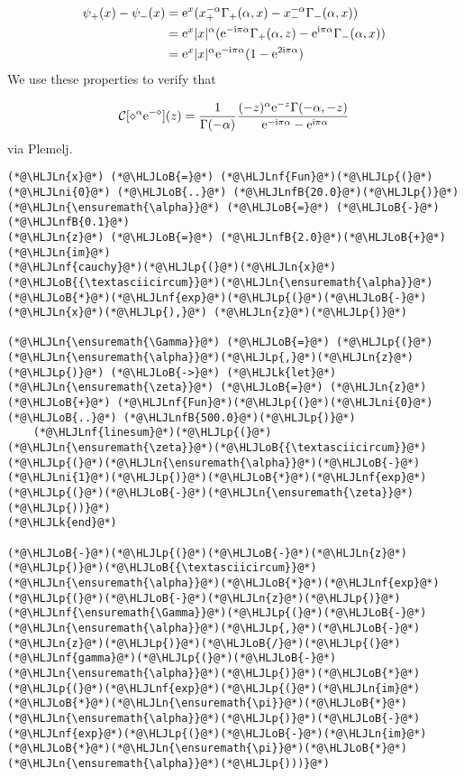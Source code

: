 \documentclass[12pt,landscape]{article}
\newcommand{\HLJLk}[1]{\textcolor[RGB]{148,91,176}{\textbf{#1}}}
\newcommand{\HLJLn}[1]{#1}
\newcommand{\HLJLnf}[1]{\textcolor[RGB]{66,102,213}{#1}}
\newcommand{\HLJLnfB}[1]{\textcolor[RGB]{59,151,46}{#1}}
\newcommand{\HLJLni}[1]{\textcolor[RGB]{59,151,46}{#1}}
\newcommand{\HLJLoB}[1]{\textcolor[RGB]{102,102,102}{\textbf{#1}}}
\newcommand{\HLJLp}[1]{#1}
\def\I{ {\rm i} }
\def\E{ {\rm e} }
\def\CC{ {\cal C} }
\def\addtab#1={#1\;&=}
\def\ccr{\\\addtab}
\def\addtab#1={#1\;&=}
\def\ccr{\\\addtab}
\begin{document}
{\begin{align*}
\psi_+(x) - \psi_-(x) &= \E^x(x_+^{-\alpha} \Gamma_+(\alpha, x) -  x_-^{-\alpha}\Gamma_-(\alpha, x)) \ccr
= \E^x |x|^\alpha (\E^{-\I \pi \alpha} \Gamma_+(\alpha, z) - \E^{\I \pi \alpha} \Gamma_-(\alpha,x)) \ccr
 = \E^x |x|^\alpha \E^{-\I \pi \alpha} (1-\E^{2 \I \pi \alpha})
\end{align*}
We use these properties to verify that

\[
\CC[\diamond^\alpha \E^{-\diamond}](z) = {1 \over \Gamma(-\alpha)} {(-z)^\alpha \E^{-z} \Gamma(-\alpha, - z) \over
  \E^{-\I\pi\alpha} - \E^{\I\pi\alpha}}
\]
via Plemelj.


\begin{lstlisting}
(*@\HLJLn{x}@*) (*@\HLJLoB{=}@*) (*@\HLJLnf{Fun}@*)(*@\HLJLp{(}@*)(*@\HLJLni{0}@*) (*@\HLJLoB{..}@*) (*@\HLJLnfB{20.0}@*)(*@\HLJLp{)}@*)
(*@\HLJLn{\ensuremath{\alpha}}@*) (*@\HLJLoB{=}@*) (*@\HLJLoB{-}@*)(*@\HLJLnfB{0.1}@*)
(*@\HLJLn{z}@*) (*@\HLJLoB{=}@*) (*@\HLJLnfB{2.0}@*)(*@\HLJLoB{+}@*)(*@\HLJLn{im}@*)
(*@\HLJLnf{cauchy}@*)(*@\HLJLp{(}@*)(*@\HLJLn{x}@*)(*@\HLJLoB{{\textasciicircum}}@*)(*@\HLJLn{\ensuremath{\alpha}}@*)(*@\HLJLoB{*}@*)(*@\HLJLnf{exp}@*)(*@\HLJLp{(}@*)(*@\HLJLoB{-}@*)(*@\HLJLn{x}@*)(*@\HLJLp{),}@*) (*@\HLJLn{z}@*)(*@\HLJLp{)}@*)

(*@\HLJLn{\ensuremath{\Gamma}}@*) (*@\HLJLoB{=}@*) (*@\HLJLp{(}@*)(*@\HLJLn{\ensuremath{\alpha}}@*)(*@\HLJLp{,}@*)(*@\HLJLn{z}@*)(*@\HLJLp{)}@*) (*@\HLJLoB{->}@*) (*@\HLJLk{let}@*) (*@\HLJLn{\ensuremath{\zeta}}@*) (*@\HLJLoB{=}@*) (*@\HLJLn{z}@*) (*@\HLJLoB{+}@*) (*@\HLJLnf{Fun}@*)(*@\HLJLp{(}@*)(*@\HLJLni{0}@*) (*@\HLJLoB{..}@*) (*@\HLJLnfB{500.0}@*)(*@\HLJLp{)}@*)
    (*@\HLJLnf{linesum}@*)(*@\HLJLp{(}@*)(*@\HLJLn{\ensuremath{\zeta}}@*)(*@\HLJLoB{{\textasciicircum}}@*)(*@\HLJLp{(}@*)(*@\HLJLn{\ensuremath{\alpha}}@*)(*@\HLJLoB{-}@*)(*@\HLJLni{1}@*)(*@\HLJLp{)}@*)(*@\HLJLoB{*}@*)(*@\HLJLnf{exp}@*)(*@\HLJLp{(}@*)(*@\HLJLoB{-}@*)(*@\HLJLn{\ensuremath{\zeta}}@*)(*@\HLJLp{))}@*)
(*@\HLJLk{end}@*)

(*@\HLJLoB{-}@*)(*@\HLJLp{(}@*)(*@\HLJLoB{-}@*)(*@\HLJLn{z}@*)(*@\HLJLp{)}@*)(*@\HLJLoB{{\textasciicircum}}@*)(*@\HLJLn{\ensuremath{\alpha}}@*)(*@\HLJLoB{*}@*)(*@\HLJLnf{exp}@*)(*@\HLJLp{(}@*)(*@\HLJLoB{-}@*)(*@\HLJLn{z}@*)(*@\HLJLp{)}@*)(*@\HLJLnf{\ensuremath{\Gamma}}@*)(*@\HLJLp{(}@*)(*@\HLJLoB{-}@*)(*@\HLJLn{\ensuremath{\alpha}}@*)(*@\HLJLp{,}@*)(*@\HLJLoB{-}@*)(*@\HLJLn{z}@*)(*@\HLJLp{)}@*)(*@\HLJLoB{/}@*)(*@\HLJLp{(}@*)(*@\HLJLnf{gamma}@*)(*@\HLJLp{(}@*)(*@\HLJLoB{-}@*)(*@\HLJLn{\ensuremath{\alpha}}@*)(*@\HLJLp{)}@*)(*@\HLJLoB{*}@*)(*@\HLJLp{(}@*)(*@\HLJLnf{exp}@*)(*@\HLJLp{(}@*)(*@\HLJLn{im}@*)(*@\HLJLoB{*}@*)(*@\HLJLn{\ensuremath{\pi}}@*)(*@\HLJLoB{*}@*)(*@\HLJLn{\ensuremath{\alpha}}@*)(*@\HLJLp{)}@*)(*@\HLJLoB{-}@*)(*@\HLJLnf{exp}@*)(*@\HLJLp{(}@*)(*@\HLJLoB{-}@*)(*@\HLJLn{im}@*)(*@\HLJLoB{*}@*)(*@\HLJLn{\ensuremath{\pi}}@*)(*@\HLJLoB{*}@*)(*@\HLJLn{\ensuremath{\alpha}}@*)(*@\HLJLp{)))}@*)
\end{lstlisting}

}
\end{document}
